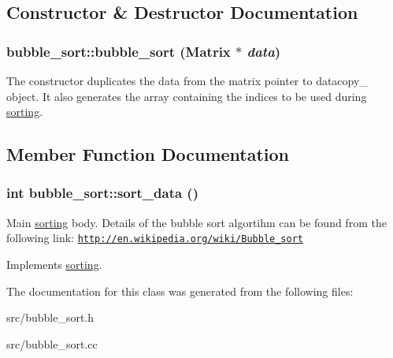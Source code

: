\subsection{Constructor \& Destructor Documentation}
\hypertarget{classbubble__sort_aa413fc87fd7b9a0da354c0da0bfc0fa2}{
\subsubsection[{bubble\_\-sort}]{\setlength{\rightskip}{0pt plus 5cm}bubble\_\-sort::bubble\_\-sort ({\bf Matrix} $\ast$ {\em data})}}
\label{dc/d2f/classbubble__sort_aa413fc87fd7b9a0da354c0da0bfc0fa2}
The constructor duplicates the data from the matrix pointer to datacopy\_\- object. It also generates the array containing the indices to be used during \hyperlink{classsorting}{sorting}. 

\subsection{Member Function Documentation}
\hypertarget{classbubble__sort_a8fdc845adc8e24bbb169b79ef5140ee2}{
\subsubsection[{sort\_\-data}]{\setlength{\rightskip}{0pt plus 5cm}int bubble\_\-sort::sort\_\-data ()}}
\label{dc/d2f/classbubble__sort_a8fdc845adc8e24bbb169b79ef5140ee2}


Main \hyperlink{classsorting}{sorting} body. Details of the bubble sort algortihm can be found from the following link: \href{http://en.wikipedia.org/wiki/Bubble_sort}{\tt http://en.wikipedia.org/wiki/Bubble\_\-sort} 

Implements \hyperlink{classsorting_a94c4b729732743299f3dcd2505312381}{sorting}.

The documentation for this class was generated from the following files:\begin{DoxyCompactItemize}
\item 
src/bubble\_\-sort.h\item 
src/bubble\_\-sort.cc\end{DoxyCompactItemize}
